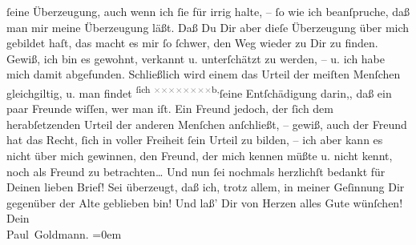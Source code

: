 \begin{ledgroupsized}[t]{13cm}
               ſeine Überzeugung, auch wenn ich ſie für irrig halte, – ſo wie ich beanſpruche, daß
               man mir meine Überzeugung läßt. Daß Du Dir aber dieſe Überzeugung über mich gebildet
               haſt, das macht es mir ſo ſchwer, den Weg wieder zu Dir zu finden. Gewiß, ich bin es
               gewohnt, verkannt u. unterſchätzt {\pb}zu werden, –
               u. ich habe mich damit abgefunden. Schließlich wird einem das Urteil der meiſten
               Menſchen gleichgiltig, u. man findet \substVorne{}\textsuperscript{ſich \textcolor{gray}{×}\-\textcolor{gray}{×}\-\textcolor{gray}{×}\-\textcolor{gray}{×}\-\textcolor{gray}{×}\-\textcolor{gray}{×}\-\textcolor{gray}{×}\-\textcolor{gray}{×}b,}{\allowbreak}\substDazwischen{}ſeine Entſchädigung darin,\substHinten{}, daß ein paar Freunde wiſſen, wer man iſt.\pend
           \pstart
           Ein Freund jedoch,  der ſich dem herabſetzenden Urteil der anderen Menſchen anſchließt, – gewiß,
               auch der Freund hat das Recht, ſich in voller Freiheit ſein Urteil zu bilden, – ich
               aber kann es nicht über mich {\pb}gewinnen, den
               Freund, der mich kennen müßte u. nicht kennt, noch als Freund zu betrachten{\dots}\pend
           \pstart
           Und nun ſei nochmals herzlichſt bedankt für Deinen lieben Brief! Sei überzeugt, daß
               ich, trotz allem, in meiner Geſinnung Dir gegenüber der Alte geblieben bin! Und laß’
               Dir von Herzen alles Gute wünſchen!\pend
           \pstart
           Dein {\\[\baselineskip]}\spacefill\mbox{Paul Goldmann.}\pend
           \leftskip=0em{}
         
         \endnumbering{}\end{ledgroupsized}  \newcommand{\dateiname}{L03478}\newcommand{\titel}{Paul Goldmann an Arthur Schnitzler, 16. 2. 1925}\newcommand{\editorInnen}{Martin Anton Müller und Laura Untner}
      